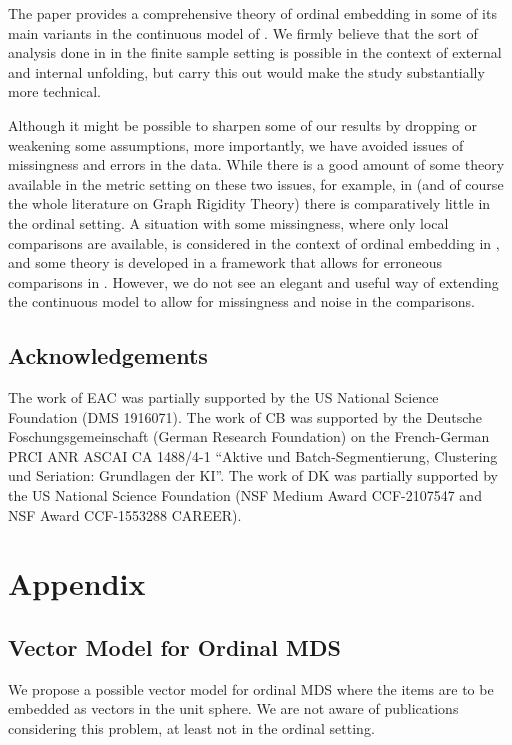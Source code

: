 \documentclass[twoside, 11pt]{article}
\begin{document}
The paper provides a comprehensive theory of ordinal embedding in some of its main variants in the continuous model of \citet{shepard1966metric}. 
We firmly believe that the sort of analysis done in \cite{klein, arias2017some} in the finite sample setting is possible in the context of external and internal unfolding, but carry this out would make the study substantially more technical. 

Although it might be possible to sharpen some of our results by dropping or weakening some assumptions, more importantly, we have avoided issues of missingness and errors in the data. 
While there is a good amount of some theory available in the metric setting on these two issues, for example, in \cite{arias2020perturbation, anderson2010formal, arias2022supervising, javanmard2013localization} (and of course the whole literature on Graph Rigidity Theory) there is comparatively little in the ordinal setting.
A situation with some missingness, where only local comparisons are available, is considered in the context of ordinal embedding in \cite{arias2017some}, and some theory is developed in a framework that allows for erroneous comparisons in \cite{jain2016finite}.
However, we do not see an elegant and useful way of extending the continuous model to allow for missingness and noise in the comparisons. 


\subsection*{Acknowledgements}
The work of EAC was partially supported by the US National Science Foundation (DMS 1916071).
The work of CB was supported by the Deutsche Foschungsgemeinschaft (German Research Foundation) on the French-German PRCI ANR ASCAI CA 1488/4-1 ``Aktive und Batch-Segmentierung, Clustering und Seriation: Grundlagen der KI''.
The work of DK was partially supported by the US National Science Foundation (NSF Medium Award CCF-2107547 and NSF Award CCF-1553288 CAREER).

{\small


}

\appendix
\section{Appendix} 
\label{appendix}

\subsection{Vector Model for Ordinal MDS}
We propose a possible vector model for ordinal MDS where the items are to be embedded as vectors in the unit sphere. We are not aware of publications considering this problem, at least not in the ordinal setting. 
\end{document}
